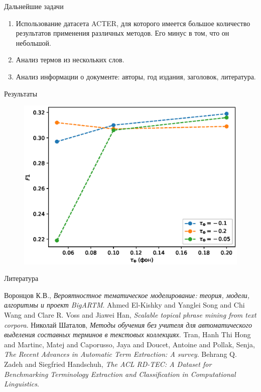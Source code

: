 \documentclass{beamer}
\begin{document}
\begin{frame}{Дальнейшие задачи}
\begin{enumerate}
    \item Использование датасета ACTER, для которого имеется большое количество результатов применения различных методов. Его минус в том, что он небольшой.
    \item Анализ термов из нескольких слов.
    \item Анализ информации о документе: авторы, год издания, заголовок, литература.
\end{enumerate}
\end{frame}

\begin{frame}{Результаты}
\begin{figure}
   \includegraphics[width=1.0\textwidth]{Pictures/Results.eps}
\end{figure}
\end{frame}

\begin{frame}{Литература}
\begin{thebibliography}{5}
\beamertemplatebookbibitems
{}
\small{\sc Воронцов К.В.}, {\em Вероятностное тематическое моделирование: теория, модели, алгоритмы и проект BigARTM}.
{\sc Ahmed El-Kishky and Yanglei Song and Chi Wang and Clare R. Voss and Jiawei Han}, {\em Scalable topical phrase mining from text corpora}.
{\sc Николай Шаталов}, {\em Методы обучения без учителя для автоматического выделения составных терминов в текстовых коллекциях}.
{\sc Tran,  Hanh Thi Hong and Martinc,  Matej and Caporusso,  Jaya and Doucet,  Antoine and Pollak,  Senja}, {\em The Recent Advances in Automatic Term Extraction: A survey}.
{\sc Behrang Q. Zadeh and Siegfried Handschuh}, {\em The {ACL} {RD}-{TEC}: A Dataset for Benchmarking Terminology Extraction and Classification in Computational Linguistics}.
\end{thebibliography}
\end{frame}
\end{document}
